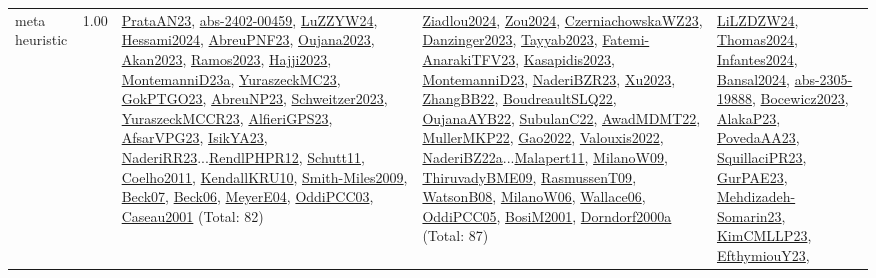 {\begin{longtable}{p{3cm}r>{\raggedright\arraybackslash}p{6cm}>{\raggedright\arraybackslash}p{6cm}>{\raggedright\arraybackslash}p{8cm}}
\index{meta heuristic}\index{Algorithms!meta heuristic}meta heuristic &  1.00 & \hyperref[detail:PrataAN23]{PrataAN23}, \hyperref[detail:abs-2402-00459]{abs-2402-00459}, \hyperref[detail:LuZZYW24]{LuZZYW24}, \hyperref[detail:Hessami2024]{Hessami2024}, \hyperref[detail:AbreuPNF23]{AbreuPNF23}, \hyperref[detail:Oujana2023]{Oujana2023}, \hyperref[detail:Akan2023]{Akan2023}, \hyperref[detail:Ramos2023]{Ramos2023}, \hyperref[detail:Hajji2023]{Hajji2023}, \hyperref[detail:MontemanniD23a]{MontemanniD23a}, \hyperref[detail:YuraszeckMC23]{YuraszeckMC23}, \hyperref[detail:GokPTGO23]{GokPTGO23}, \hyperref[detail:AbreuNP23]{AbreuNP23}, \hyperref[detail:Schweitzer2023]{Schweitzer2023}, \hyperref[detail:YuraszeckMCCR23]{YuraszeckMCCR23}, \hyperref[detail:AlfieriGPS23]{AlfieriGPS23}, \hyperref[detail:AfsarVPG23]{AfsarVPG23}, \hyperref[detail:IsikYA23]{IsikYA23}, \hyperref[detail:NaderiRR23]{NaderiRR23}...\hyperref[detail:RendlPHPR12]{RendlPHPR12}, \hyperref[detail:Schutt11]{Schutt11}, \hyperref[detail:Coelho2011]{Coelho2011}, \hyperref[detail:KendallKRU10]{KendallKRU10}, \hyperref[detail:Smith-Miles2009]{Smith-Miles2009}, \hyperref[detail:Beck07]{Beck07}, \hyperref[detail:Beck06]{Beck06}, \hyperref[detail:MeyerE04]{MeyerE04}, \hyperref[detail:OddiPCC03]{OddiPCC03}, \hyperref[detail:Caseau2001]{Caseau2001} (Total: 82) & \hyperref[detail:Ziadlou2024]{Ziadlou2024}, \hyperref[detail:Zou2024]{Zou2024}, \hyperref[detail:CzerniachowskaWZ23]{CzerniachowskaWZ23}, \hyperref[detail:Danzinger2023]{Danzinger2023}, \hyperref[detail:Tayyab2023]{Tayyab2023}, \hyperref[detail:Fatemi-AnarakiTFV23]{Fatemi-AnarakiTFV23}, \hyperref[detail:Kasapidis2023]{Kasapidis2023}, \hyperref[detail:MontemanniD23]{MontemanniD23}, \hyperref[detail:NaderiBZR23]{NaderiBZR23}, \hyperref[detail:Xu2023]{Xu2023}, \hyperref[detail:ZhangBB22]{ZhangBB22}, \hyperref[detail:BoudreaultSLQ22]{BoudreaultSLQ22}, \hyperref[detail:OujanaAYB22]{OujanaAYB22}, \hyperref[detail:SubulanC22]{SubulanC22}, \hyperref[detail:AwadMDMT22]{AwadMDMT22}, \hyperref[detail:MullerMKP22]{MullerMKP22}, \hyperref[detail:Gao2022]{Gao2022}, \hyperref[detail:Valouxis2022]{Valouxis2022}, \hyperref[detail:NaderiBZ22a]{NaderiBZ22a}...\hyperref[detail:Malapert11]{Malapert11}, \hyperref[detail:MilanoW09]{MilanoW09}, \hyperref[detail:ThiruvadyBME09]{ThiruvadyBME09}, \hyperref[detail:RasmussenT09]{RasmussenT09}, \hyperref[detail:WatsonB08]{WatsonB08}, \hyperref[detail:MilanoW06]{MilanoW06}, \hyperref[detail:Wallace06]{Wallace06}, \hyperref[detail:OddiPCC05]{OddiPCC05}, \hyperref[detail:BosiM2001]{BosiM2001}, \hyperref[detail:Dorndorf2000a]{Dorndorf2000a} (Total: 87) & \hyperref[detail:LiLZDZW24]{LiLZDZW24}, \hyperref[detail:Thomas2024]{Thomas2024}, \hyperref[detail:Infantes2024]{Infantes2024}, \hyperref[detail:Bansal2024]{Bansal2024}, \hyperref[detail:abs-2305-19888]{abs-2305-19888}, \hyperref[detail:Bocewicz2023]{Bocewicz2023}, \hyperref[detail:AlakaP23]{AlakaP23}, \hyperref[detail:PovedaAA23]{PovedaAA23}, \hyperref[detail:SquillaciPR23]{SquillaciPR23}, \hyperref[detail:GurPAE23]{GurPAE23}, \hyperref[detail:Mehdizadeh-Somarin23]{Mehdizadeh-Somarin23}, \hyperref[detail:KimCMLLP23]{KimCMLLP23}, \hyperref[detail:EfthymiouY23]{EfthymiouY23}, 
\end{longtable}}

